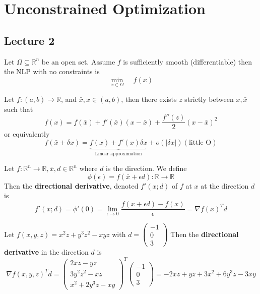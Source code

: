 \section{Unconstrained Optimization}
\subsection{Lecture 2}
\begin{Example}
    Let $\Omega \subseteq \mathbb R^n$ be an open set. Assume $f$ is sufficiently smooth (differentiable) then the NLP with no constraints is $$\min_{x \in \Omega} \;\;\;\; f(x)$$
\end{Example}
\begin{theorem}
    Let $f: (a, b) \rightarrow \mathbb R$, and $\bar{x}, x \in (a,b)$, then there exists $z$ strictly between $x, \bar x$ such that $$f(x) = f(\bar x) + f'(\bar x)(x - \bar x) + \frac{f''(z)}{2}(x - \bar x)^2$$
    or equivalently
    $$f(\bar x + \delta x) = \underbrace{f(x) + f'(x) \delta x}_{\text{Linear approximation}} + o(|\delta x|)(\text{little O})$$
\end{theorem}
\begin{lemma}
    Let $f: \mathbb R^n \rightarrow \mathbb R, \bar x, d \in \mathbb R^n$ where $d$ is the direction. We define
    $$\phi (\epsilon) = f(\bar x + \epsilon d): \mathbb R \rightarrow \mathbb R$$
    Then the \textbf{directional derivative}, denoted $f'(x; d)$ of $f$ at $x$ at the direction $d$ is
    $$f'(x; d) = \phi'(0) = \lim_{\epsilon \rightarrow 0} \frac{f(x + \epsilon d) - f(x)}{\epsilon} = \nabla f(x)^T d$$
\end{lemma}
\begin{Example}
    Let $f(x,y,z) = x^2z + y^3z^2 - xyz$ with $d = \begin{pmatrix}
        -1 \\ 0 \\ 3
    \end{pmatrix}$ Then the \textbf{directional derivative} in the direction $d$ is
    $$\nabla f(x,y,z)^T d = \begin{pmatrix}
        2xz - yz \\
        3y^2z^2 - xz \\
        x^2 + 2y^3z - xy
    \end{pmatrix}^{T} \begin{pmatrix}
        -1 \\ 0 \\ 3
    \end{pmatrix} = -2xz + yz + 3x^2 + 6y^3z - 3xy$$
\end{Example}
